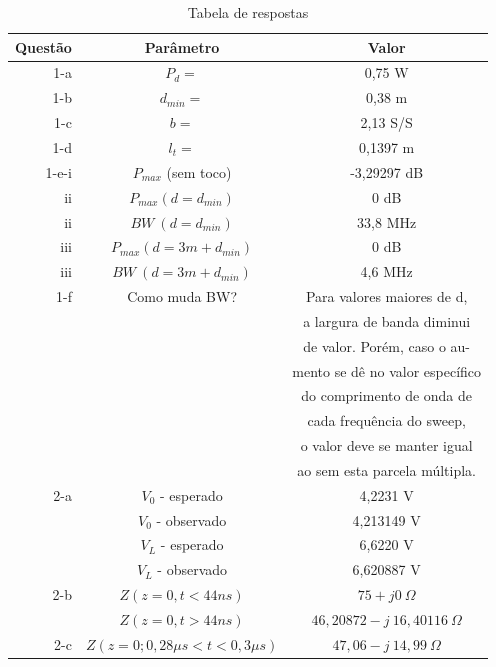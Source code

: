 \documentclass[12pt,a4paper]{article}
\begin{document}
\begin{table}[h]
    \centering
    \begin{tabular}{|r|c|c|}
         \hline
         Questão & Parâmetro & Valor \\
         \hline
         1-a& $P_d=$ & 0,75 W\\
         1-b& $d_{min}=$ & 0,38 m\\
         1-c& $b=$ & 2,13 S/S\\
         1-d& $l_t=$ & 0,1397 m\\
         1-e-i& $P_{max}$ (sem toco) & -3,29297 dB \\
         ii& $P_{max}(d=d_{min})$ & 0 dB\\
         ii& $BW\ (d=d_{min})$ & 33,8 MHz\\
         iii& $P_{max}(d=3m+d_{min})$ & 0 dB\\
         iii& $BW\ (d=3m+d_{min})$ & 4,6 MHz\\
         1-f& Como muda BW? &  Para valores maiores de d,\\
         &&a largura de banda diminui\\
         &&de valor. Porém, caso o au- \\
         &&mento se dê no valor específico \\
         &&do comprimento de onda de\\
         &&cada frequência do sweep,\\
         &&o valor deve se manter igual\\
         &&ao sem esta parcela múltipla.\\
         2-a& $V_0$ - esperado & 4,2231 V\\
         & $V_0$ - observado & 4,213149 V\\
         & $V_L$ - esperado & 6,6220 V\\
         & $V_L$ - observado & 6,620887 V\\
         2-b& $Z(z=0,t<44ns)$ & $75 + j 0\ \Omega$\\
         & $Z(z=0,t>44ns)$ & $46,20872-j\ 16,40116\ \Omega $\\
         2-c& $Z(z=0;0,28\mu s<t<0,3\mu s)$ & $47,06-j\ 14,99 \ \Omega $\\
         \hline
    \end{tabular}
    \caption{Tabela de respostas}
    \label{tab:Renata}
\end{table}


\end{document}
